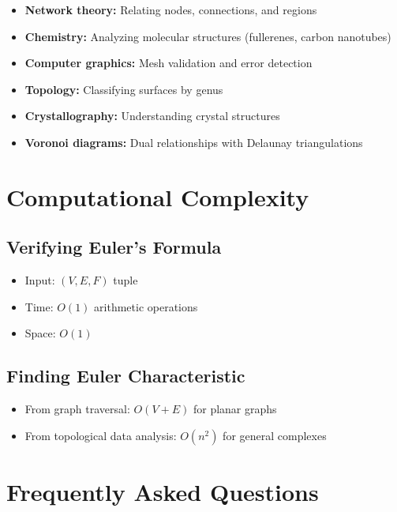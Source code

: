 \begin{itemize}
\item \textbf{Network theory:} Relating nodes, connections, and regions
\item \textbf{Chemistry:} Analyzing molecular structures (fullerenes, carbon nanotubes)
\item \textbf{Computer graphics:} Mesh validation and error detection
\item \textbf{Topology:} Classifying surfaces by genus
\item \textbf{Crystallography:} Understanding crystal structures
\item \textbf{Voronoi diagrams:} Dual relationships with Delaunay triangulations
\end{itemize}

\section{Computational Complexity}

\subsection{Verifying Euler's Formula}
\begin{itemize}
\item Input: $(V, E, F)$ tuple
\item Time: $O(1)$ arithmetic operations
\item Space: $O(1)$
\end{itemize}

\subsection{Finding Euler Characteristic}
\begin{itemize}
\item From graph traversal: $O(V + E)$ for planar graphs
\item From topological data analysis: $O(n^2)$ for general complexes
\end{itemize}

\section{Frequently Asked Questions}

